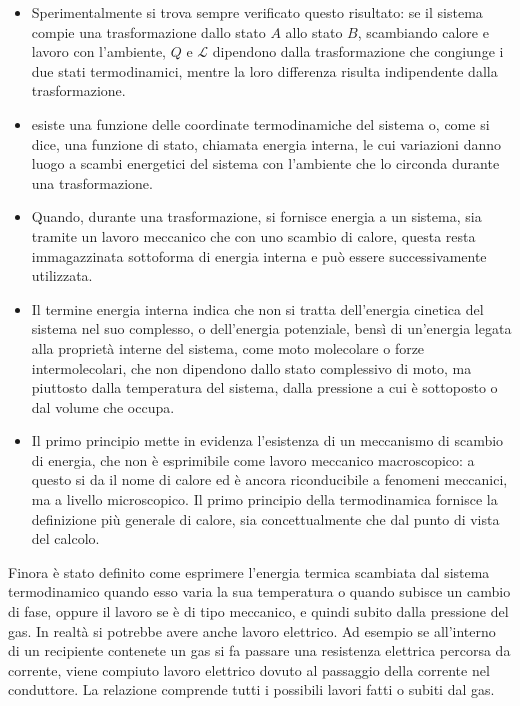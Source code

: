 \begin{itemize}
	\item Sperimentalmente si trova sempre verificato questo risultato: se il sistema compie una trasformazione dallo stato $A$ allo stato $B$, scambiando calore e lavoro con l'ambiente, $Q$ e $\mathcal{L}$ dipendono dalla trasformazione che congiunge i due stati termodinamici, mentre la loro differenza risulta indipendente dalla trasformazione.
	\item esiste una funzione delle coordinate termodinamiche del sistema o, come si dice, una funzione di stato, chiamata energia interna, le cui variazioni danno luogo a scambi energetici del sistema con l'ambiente che lo circonda durante una trasformazione.
	\item Quando, durante una trasformazione, si fornisce energia a un sistema, sia tramite un lavoro meccanico che con uno scambio di calore, questa resta immagazzinata sottoforma di energia interna e può essere successivamente
	utilizzata.
	\item Il termine energia interna indica che non si tratta dell'energia cinetica del sistema nel suo complesso, o dell'energia potenziale, bensì di un'energia legata alla proprietà interne del sistema, come moto molecolare o forze intermolecolari, che non dipendono dallo stato complessivo di moto, ma piuttosto dalla temperatura del sistema, dalla pressione a cui è sottoposto o dal volume che occupa.
	\item Il primo principio mette in evidenza l'esistenza di un meccanismo di scambio di energia, che non è esprimibile come lavoro meccanico macroscopico: a questo si da il nome di calore ed è ancora riconducibile a fenomeni meccanici, ma a livello microscopico. Il primo principio della termodinamica fornisce la definizione più generale di calore, sia concettualmente che dal punto di vista del calcolo.
\end{itemize}

Finora è stato definito come esprimere l'energia termica scambiata dal sistema termodinamico quando esso varia la sua temperatura o quando subisce un cambio di fase, oppure il lavoro se è di tipo meccanico, e quindi subito dalla pressione del gas. In realtà si potrebbe avere anche lavoro elettrico. Ad esempio se all'interno di un recipiente contenete un gas si fa passare una resistenza elettrica percorsa da corrente, viene compiuto lavoro elettrico dovuto al passaggio della corrente nel conduttore. La relazione comprende tutti i possibili lavori fatti o subiti dal gas.

